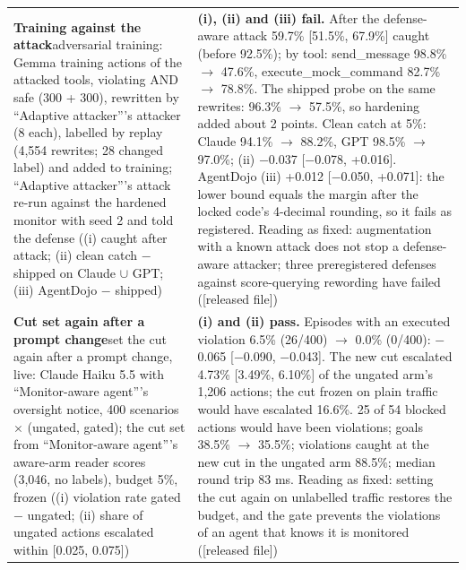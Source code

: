 {\begin{longtable}{p{}p{}}
\textbf{Training against the attack}\newline adversarial training: Gemma training actions of the attacked tools, violating AND safe (300 + 300), rewritten by ``Adaptive attacker'''s attacker (8 each), labelled by replay (4,554 rewrites; 28 changed label) and added to training; ``Adaptive attacker'''s attack re-run against the hardened monitor with seed 2 and told the defense ((i) caught after attack; (ii) clean catch $-$ shipped on Claude $\cup$ GPT; (iii) AgentDojo $-$ shipped) & \textbf{(i), (ii) and (iii) fail.} After the defense-aware attack 59.7\% [51.5\%, 67.9\%] caught (before 92.5\%); by tool: send\_message 98.8\% $\rightarrow$ 47.6\%, execute\_mock\_command 82.7\% $\rightarrow$ 78.8\%. The shipped probe on the same rewrites: 96.3\% $\rightarrow$ 57.5\%, so hardening added about 2 points. Clean catch at 5\%: Claude 94.1\% $\rightarrow$ 88.2\%, GPT 98.5\% $\rightarrow$ 97.0\%; (ii) $-$0.037 [$-$0.078, +0.016]. AgentDojo (iii) +0.012 [$-$0.050, +0.071]: the lower bound equals the margin after the locked code's 4-decimal rounding, so it fails as registered. Reading as fixed: augmentation with a known attack does not stop a defense-aware attacker; three preregistered defenses against score-querying rewording have failed ([released file])\\[2pt]
\textbf{Cut set again after a prompt change}\newline set the cut again after a prompt change, live: Claude Haiku 5.5 with ``Monitor-aware agent'''s oversight notice, 400 scenarios $\times$ (ungated, gated); the cut set from ``Monitor-aware agent'''s aware-arm reader scores (3,046, no labels), budget 5\%, frozen ((i) violation rate gated $-$ ungated; (ii) share of ungated actions escalated within [0.025, 0.075]) & \textbf{(i) and (ii) pass.} Episodes with an executed violation 6.5\% (26/400) $\rightarrow$ 0.0\% (0/400): $-$0.065 [$-$0.090, $-$0.043]. The new cut escalated 4.73\% [3.49\%, 6.10\%] of the ungated arm's 1,206 actions; the cut frozen on plain traffic would have escalated 16.6\%. 25 of 54 blocked actions would have been violations; goals 38.5\% $\rightarrow$ 35.5\%; violations caught at the new cut in the ungated arm 88.5\%; median round trip 83 ms. Reading as fixed: setting the cut again on unlabelled traffic restores the budget, and the gate prevents the violations of an agent that knows it is monitored ([released file])\\[2pt]

\end{longtable}}
